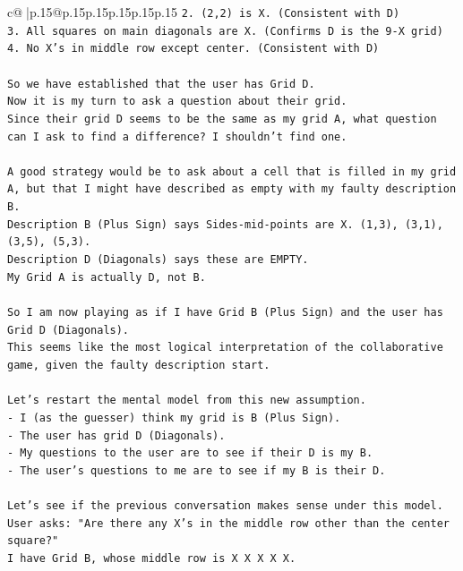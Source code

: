 \documentclass{article}
\begin{document}
{\begin{supertabular}{c@{$\;$}|p{.15\linewidth}@{}p{.15\linewidth}p{.15\linewidth}p{.15\linewidth}p{.15\linewidth}p{.15\linewidth}}
{{{\texttt{2. (2,2) is X. (Consistent with D)} \\
\texttt{3. All squares on main diagonals are X. (Confirms D is the 9{-}X grid)} \\
\texttt{4. No X's in middle row except center. (Consistent with D)} \\
\\ 
\texttt{So we have established that the user has Grid D.} \\
\texttt{Now it is my turn to ask a question about their grid.} \\
\texttt{Since their grid D seems to be the same as my grid A, what question can I ask to find a difference? I shouldn't find one.} \\
\\ 
\texttt{A good strategy would be to ask about a cell that is filled in my grid A, but that I might have described as empty with my faulty description B.} \\
\texttt{Description B (Plus Sign) says Sides{-}mid{-}points are X. (1,3), (3,1), (3,5), (5,3).} \\
\texttt{Description D (Diagonals) says these are EMPTY.} \\
\texttt{My Grid A is actually D, not B.} \\
\\ 
\texttt{So I am now playing as if I have Grid B (Plus Sign) and the user has Grid D (Diagonals).} \\
\texttt{This seems like the most logical interpretation of the collaborative game, given the faulty description start.} \\
\\ 
\texttt{Let's restart the mental model from this new assumption.} \\
\texttt{{-} I (as the guesser) think my grid is B (Plus Sign).} \\
\texttt{{-} The user has grid D (Diagonals).} \\
\texttt{{-} My questions to the user are to see if their D is my B.} \\
\texttt{{-} The user's questions to me are to see if my B is their D.} \\
\\ 
\texttt{Let's see if the previous conversation makes sense under this model.} \\
\texttt{User asks: "Are there any X's in the middle row other than the center square?"} \\
\texttt{I have Grid B, whose middle row is X X X X X.} \\
}}}
\end{supertabular}}
\end{document}
